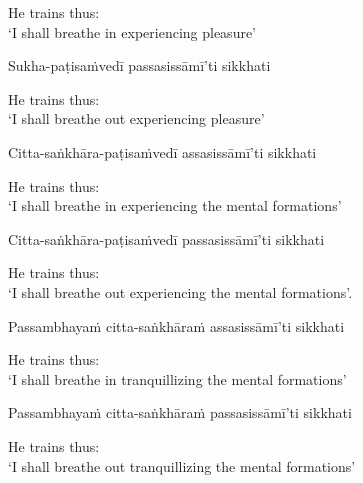 
\begin{english}
  He trains thus:\\
  `I shall breathe in experiencing pleasure'
\end{english}

Sukha-paṭisaṁvedī passasissāmī'ti sikkhati

\begin{english}
  He trains thus:\\
  `I shall breathe out experiencing pleasure'
\end{english}

Citta-saṅkhāra-paṭisaṁvedī assasissāmī'ti sikkhati

\begin{english}
  He trains thus:\\
  `I shall breathe in experiencing the mental formations'
\end{english}

Citta-saṅkhāra-paṭisaṁvedī passasissāmī'ti sikkhati

\begin{english}
  He trains thus:\\
  `I shall breathe out experiencing the mental formations'.
\end{english}

Passambhayaṁ citta-saṅkhāraṁ assasissāmī'ti sikkhati

\begin{english}
  He trains thus:\\
  `I shall breathe in tranquillizing the mental formations'
\end{english}

Passambhayaṁ citta-saṅkhāraṁ passasissāmī'ti sikkhati

\begin{english}
  He trains thus:\\
  `I shall breathe out tranquillizing the mental formations'
\end{english}


